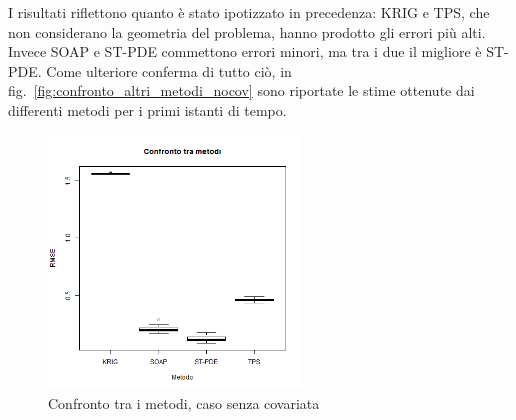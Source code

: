 \documentclass[a4paper,11pt,twoside,openright]{book}							%
\begin{document}
I risultati riflettono quanto è stato ipotizzato in precedenza: KRIG e TPS, che non considerano la geometria del problema, hanno prodotto gli errori più alti. Invece SOAP e ST-PDE commettono errori minori, ma tra i due il migliore è ST-PDE. Come ulteriore conferma di tutto ciò, in fig.~\ref{fig:confronto_altri_metodi_nocov} sono riportate le stime ottenute dai differenti metodi per i primi istanti di tempo.  

\begin{figure}[t]
	\centering
	\includegraphics[width=0.60\textwidth]{Immagini/Confronto_metodi.png}   
	\caption{Confronto tra i metodi, caso senza covariata}
	\label{fig:cfr}
\end{figure}
\end{document}
